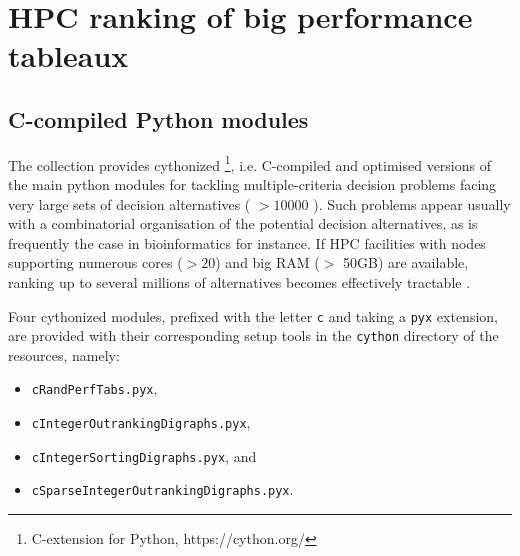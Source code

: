 \chapter{HPC ranking of big performance tableaux}
\label{sec:11}



\section{C-compiled Python modules}
\label{sec:11.1}

The \Digraph collection provides cythonized \footnote{\Cython C-extension for Python, https://cython.org/}, i.e. C-compiled and optimised versions of the main python modules for tackling multiple-criteria decision problems facing very large sets of decision alternatives ( $> 10000$ ). Such problems appear usually with a combinatorial organisation of the potential decision alternatives, as is frequently the case in bioinformatics for instance. If HPC facilities with nodes supporting numerous cores ($> 20$) and big RAM ($>$ 50GB) are available, ranking up to several millions of alternatives becomes effectively tractable \citep{BIS-2016}.

Four cythonized \Digraph modules, prefixed with the letter \texttt{c} and taking a \texttt{pyx} extension, are provided with their corresponding setup tools in the \texttt{cython} directory of the \Digraph resources, namely:
\begin{itemize}[topsep=1pt]
\item[] \texttt{cRandPerfTabs.pyx},
\item[] \texttt{cIntegerOutrankingDigraphs.pyx},
\item[] \texttt{cIntegerSortingDigraphs.pyx}, and
\item[] \texttt{cSparseIntegerOutrankingDigraphs.pyx}.
\end{itemize}

